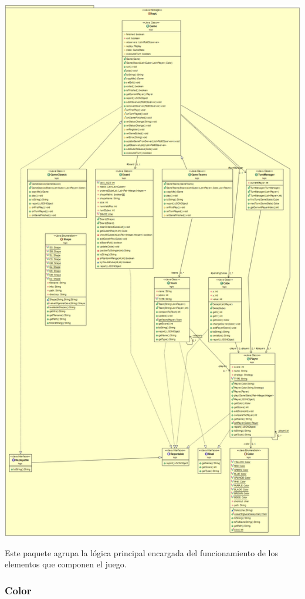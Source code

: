 \documentclass[12pt,a4paper,openright]{book}
\theoremstyle{break}
\begin{document}
\begin{center}
\includegraphics[scale=0.27]{Logic-sprint7.png}
\end{center}

Este paquete agrupa la lógica principal encargada del funcionamiento de los elementos que componen el juego.

\subsubsection{Color}
\end{document}
